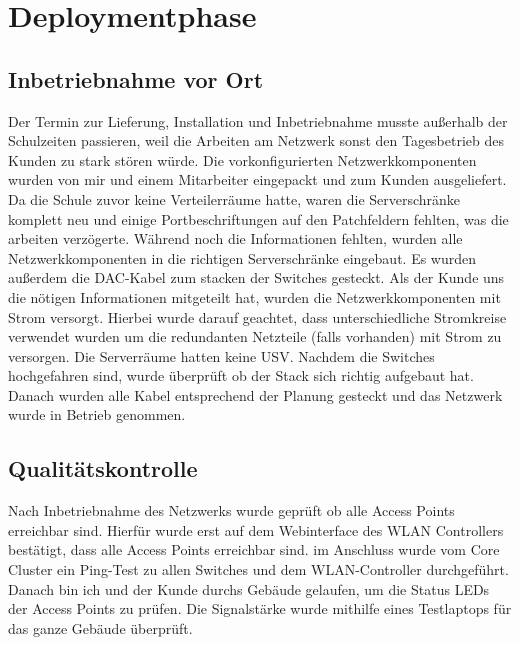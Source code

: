 \section{Deploymentphase} 
\label{sec:Deploymentphase}
\subsection{Inbetriebnahme vor Ort}
\label{Inbetriebnahme vor Ort}
Der Termin zur Lieferung, Installation und Inbetriebnahme musste außerhalb der Schulzeiten passieren, weil die Arbeiten am Netzwerk sonst den Tagesbetrieb des Kunden zu stark stören würde. Die vorkonfigurierten Netzwerkkomponenten wurden von mir und einem Mitarbeiter  eingepackt und zum Kunden ausgeliefert. Da die Schule zuvor keine Verteilerräume hatte, waren die Serverschränke komplett neu und einige Portbeschriftungen auf den Patchfeldern fehlten, was die arbeiten verzögerte. Während noch die Informationen fehlten, wurden alle Netzwerkkomponenten in die richtigen Serverschränke eingebaut. Es wurden außerdem die \ac{DAC}-Kabel zum stacken der Switches gesteckt. Als der Kunde uns die nötigen Informationen mitgeteilt hat, wurden die Netzwerkkomponenten mit Strom versorgt. Hierbei wurde darauf geachtet, dass unterschiedliche Stromkreise verwendet wurden um die redundanten Netzteile (falls vorhanden) mit Strom zu versorgen. Die Serverräume hatten keine \ac{USV}. Nachdem die Switches hochgefahren sind, wurde überprüft ob der Stack sich richtig aufgebaut hat. Danach wurden alle Kabel entsprechend der Planung gesteckt und das Netzwerk wurde in Betrieb genommen.

\subsection{Qualitätskontrolle}
\label{app:Qualitätskontrolle}
Nach Inbetriebnahme des Netzwerks wurde geprüft ob alle Access Points erreichbar sind. Hierfür wurde erst auf dem Webinterface des WLAN Controllers bestätigt, dass alle Access Points erreichbar sind. im Anschluss wurde vom Core Cluster ein Ping-Test zu allen Switches und dem WLAN-Controller durchgeführt. Danach bin ich und der Kunde durchs Gebäude gelaufen, um die Status LEDs der Access Points zu prüfen. Die Signalstärke wurde mithilfe eines Testlaptops für das ganze Gebäude überprüft.